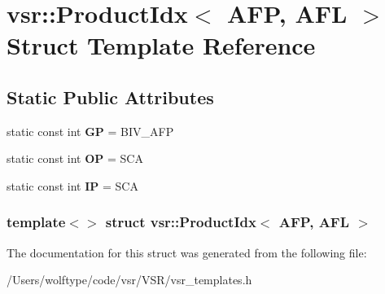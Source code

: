 \hypertarget{structvsr_1_1_product_idx_3_01_a_f_p_00_01_a_f_l_01_4}{\section{vsr\-:\-:Product\-Idx$<$ A\-F\-P, A\-F\-L $>$ Struct Template Reference}
\label{structvsr_1_1_product_idx_3_01_a_f_p_00_01_a_f_l_01_4}
}
\subsection*{Static Public Attributes}
\begin{DoxyCompactItemize}
\item 
\hypertarget{structvsr_1_1_product_idx_3_01_a_f_p_00_01_a_f_l_01_4_a89360751a34b2cef20082a3cc55eea07}{static const int {\bfseries G\-P} = B\-I\-V\-\_\-\-A\-F\-P}\label{structvsr_1_1_product_idx_3_01_a_f_p_00_01_a_f_l_01_4_a89360751a34b2cef20082a3cc55eea07}

\item 
\hypertarget{structvsr_1_1_product_idx_3_01_a_f_p_00_01_a_f_l_01_4_a584fb263f7bc632181bd8d91afe3c178}{static const int {\bfseries O\-P} = S\-C\-A}\label{structvsr_1_1_product_idx_3_01_a_f_p_00_01_a_f_l_01_4_a584fb263f7bc632181bd8d91afe3c178}

\item 
\hypertarget{structvsr_1_1_product_idx_3_01_a_f_p_00_01_a_f_l_01_4_a6283f6d24c8310c265739f89c553c214}{static const int {\bfseries I\-P} = S\-C\-A}\label{structvsr_1_1_product_idx_3_01_a_f_p_00_01_a_f_l_01_4_a6283f6d24c8310c265739f89c553c214}

\end{DoxyCompactItemize}
\subsubsection*{template$<$$>$ struct vsr\-::\-Product\-Idx$<$ A\-F\-P, A\-F\-L $>$}



The documentation for this struct was generated from the following file\-:\begin{DoxyCompactItemize}
\item 
/\-Users/wolftype/code/vsr/\-V\-S\-R/vsr\-\_\-templates.\-h\end{DoxyCompactItemize}
